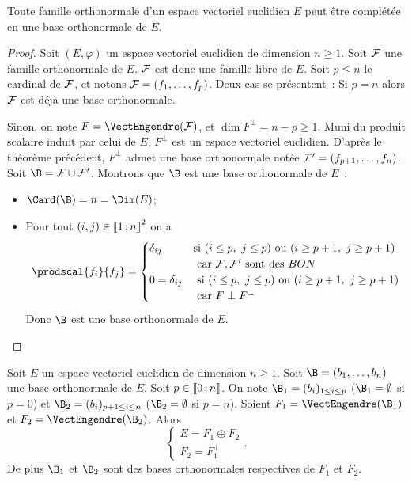 \begin{theo}
  Toute famille orthonormale d'un espace vectoriel euclidien $E$ peut être complétée en une base orthonormale de $E$.
\end{theo}
\begin{proof}
  Soit $(E,\varphi)$ un espace vectoriel euclidien de dimension $n \geq 1$. Soit $\mathcal{F}$ une famille orthonormale de $E$. $\mathcal{F}$ est donc une famille libre de $E$. Soit $p \leq n$ le cardinal de $\mathcal{F}$, et notons $\mathcal{F}=(f_1, \ldots, f_p)$. Deux cas se présentent~: Si $p=n$ alors $\mathcal{F}$ est déjà une base orthonormale.

  Sinon, on note $F=\VectEngendre(\F)$, et $\dim F^{\perp} = n-p\geq 1$. Muni du produit scalaire induit par celui de $E$, $F^\perp$ est un espace vectoriel euclidien. D'après le théorème précédent, $F^\perp$ admet une base orthonormale notée $\mathcal{F}'=(f_{p+1}, \ldots, f_{n})$. Soit $\B=\F\cup\F'$. Montrons que $\B$ est une base orthonormale de $E$~:
  \begin{itemize}
  \item $\Card(\B)=n=\Dim(E)$;
  \item Pour tout $(i,j) \in \mathopen{\llbracket}1\mathclose{}\mathpunct{};n\mathclose{\rrbracket}^2$ on a
    \begin{equation}
      \prodscal{f_i}{f_j} = \begin{cases} \delta_{ij} & \text{si~} (i \leq p, \ j \leq p) \text{~ou~} (i \geq p+1, \ j \geq p+1) \\
        & \text{~car~} \F, \F'\text{~sont des~} BON \\
        0=\delta_{ij} & \text{~si~} (i \leq p, \ j \leq p) \text{~ou~} (i \geq p+1, \ j \geq p+1)\\
        &  \text{~car~} F \perp F^\perp 
      \end{cases}
    \end{equation}
    Donc $\B$ est une base orthonormale de $E$.
  \end{itemize}
\end{proof}
\begin{theo}
  Soit $E$ un espace vectoriel euclidien de dimension $n \geq 1$. Soit $\B=(b_1, \ldots, b_n)$ une base orthonormale de $E$. Soit $p \in \mathopen{\llbracket}0\mathclose{}\mathpunct{};n\mathclose{\rrbracket}$. On note $\B_1 = (b_i)_{1 \leq i \leq p}$ ($\B_1 = \emptyset$ si $p=0$) et $\B_2 = (b_i)_{p+1 \leq i \leq n}$ ($\B_2 = \emptyset$ si $p=n$). Soient $F_1=\VectEngendre(\B_1)$ et $F_2=\VectEngendre(\B_2)$. Alors
  \begin{equation}
    \begin{cases}
      E = F_1 \oplus F_2 \\
      F_2 = F_1^\perp
    \end{cases}.
  \end{equation}
  De plus $\B_1$ et $\B_2$ sont des bases orthonormales respectives de $F_1$ et $F_2$.
\end{theo}
